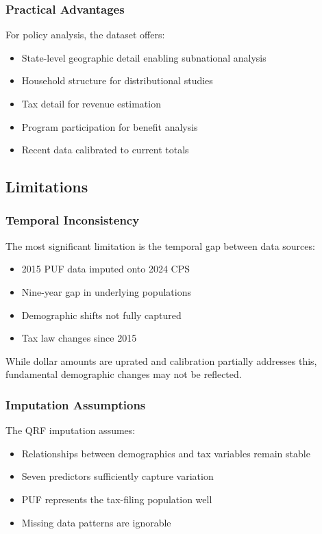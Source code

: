 \subsubsection{Practical Advantages}

For policy analysis, the dataset offers:
\begin{itemize}
\item State-level geographic detail enabling subnational analysis
\item Household structure for distributional studies
\item Tax detail for revenue estimation
\item Program participation for benefit analysis
\item Recent data calibrated to current totals
\end{itemize}

\subsection{Limitations}

\subsubsection{Temporal Inconsistency}

The most significant limitation is the temporal gap between data sources:
\begin{itemize}
\item 2015 PUF data imputed onto 2024 CPS
\item Nine-year gap in underlying populations
\item Demographic shifts not fully captured
\item Tax law changes since 2015
\end{itemize}

While dollar amounts are uprated and calibration partially addresses this, fundamental demographic changes may not be reflected.

\subsubsection{Imputation Assumptions}

The QRF imputation assumes:
\begin{itemize}
\item Relationships between demographics and tax variables remain stable
\item Seven predictors sufficiently capture variation
\item PUF represents the tax-filing population well
\item Missing data patterns are ignorable
\end{itemize}

